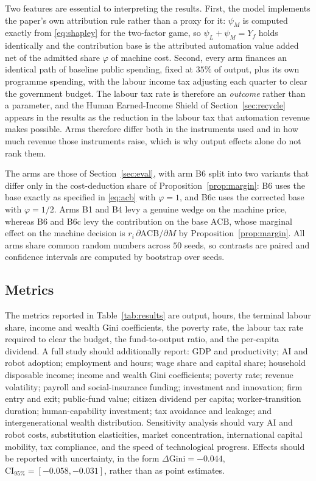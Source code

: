 \documentclass[journal]{IEEEtran}
\theoremstyle{plain}
\theoremstyle{definition}
\newcommand{\ACB}{\mathrm{ACB}}
\begin{document}
Two features are essential to interpreting the results. First, the model implements the paper's own attribution rule rather than a proxy for it: $\psi_M$ is computed exactly from \eqref{eq:shapley} for the two-factor game, so $\psi_L + \psi_M = Y_f$ holds identically and the contribution base is the attributed automation value added net of the admitted share $\varphi$ of machine cost. Second, every arm finances an identical path of baseline public spending, fixed at $35\%$ of output, plus its own programme spending, with the labour income tax adjusting each quarter to clear the government budget. The labour tax rate is therefore an \emph{outcome} rather than a parameter, and the Human Earned-Income Shield of Section~\ref{sec:recycle} appears in the results as the reduction in the labour tax that automation revenue makes possible. Arms therefore differ both in the instruments used and in how much revenue those instruments raise, which is why output effects alone do not rank them.

The arms are those of Section~\ref{sec:eval}, with arm B6 split into two variants that differ only in the cost-deduction share of Proposition~\ref{prop:margin}: B6 uses the base exactly as specified in \eqref{eq:acb} with $\varphi = 1$, and B6c uses the corrected base with $\varphi = 1/2$. Arms B1 and B4 levy a genuine wedge on the machine price, whereas B6 and B6c levy the contribution on the base $\ACB$, whose marginal effect on the machine decision is $r_i\,\partial\ACB/\partial M$ by Proposition~\ref{prop:margin}. All arms share common random numbers across $50$ seeds, so contrasts are paired and confidence intervals are computed by bootstrap over seeds.

\subsection{Metrics}

The metrics reported in Table~\ref{tab:results} are output, hours, the terminal labour share, income and wealth Gini coefficients, the poverty rate, the labour tax rate required to clear the budget, the fund-to-output ratio, and the per-capita dividend. A full study should additionally report: GDP and productivity; AI and robot adoption; employment and hours; wage share and capital share; household disposable income; income and wealth Gini coefficients; poverty rate; revenue volatility; payroll and social-insurance funding; investment and innovation; firm entry and exit; public-fund value; citizen dividend per capita; worker-transition duration; human-capability investment; tax avoidance and leakage; and intergenerational wealth distribution. Sensitivity analysis should vary AI and robot costs, substitution elasticities, market concentration, international capital mobility, tax compliance, and the speed of technological progress. Effects should be reported with uncertainty, in the form $\Delta\mathrm{Gini} = -0.044$, $\mathrm{CI}_{95\%} = [-0.058, -0.031]$, rather than as point estimates.
\end{document}
